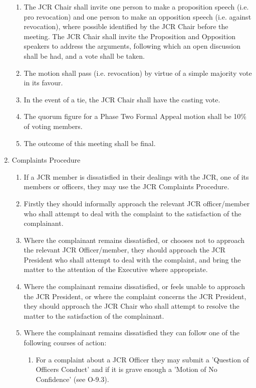 \begin{enumerate}
\begin{enumerate}
        \item The JCR Chair shall invite one person to make a proposition speech (i.e. pro revocation) and one person to make an opposition speech (i.e. against revocation), where possible identified by the JCR Chair before the meeting. The JCR Chair shall invite the Proposition and Opposition speakers to address the arguments, following which an open discussion shall be had, and a vote shall be taken.
        \item The motion shall pass (i.e. revocation) by virtue of a simple majority vote in its favour.
        \item In the event of a tie, the JCR Chair shall have the casting vote.
        \item The quorum figure for a Phase Two Formal Appeal motion shall be 10\% of voting members. 
        \item The outcome of this meeting shall be final.
    \end{enumerate}
    \item Complaints Procedure
    \begin{enumerate}
        \item If a JCR member is dissatisfied in their dealings with the JCR, one of its members or officers, they may use the JCR Complaints Procedure.
        \item Firstly they should informally approach the relevant JCR officer/member who shall attempt to deal with the complaint to the satisfaction of the complainant.
        \item Where the complainant remains dissatisfied, or chooses not to approach the relevant JCR Officer/member, they should approach the JCR President who shall attempt to deal with the complaint, and bring the matter to the attention of the Executive where appropriate.
        \item Where the complainant remains dissatisfied, or feels unable to approach the JCR President, or where the complaint concerns the JCR President, they should approach the JCR Chair who shall attempt to resolve the matter to the satisfaction of the complainant.
        \item Where the complainant remains dissatisfied they can follow one of the following courses of action:
        \begin{enumerate}
            \item For a complaint about a JCR Officer they may submit a 'Question of Officers Conduct' and
            if it is grave enough a 'Motion of No Confidence' (see O-9.3).

\end{enumerate}
\end{enumerate}
\end{enumerate}
